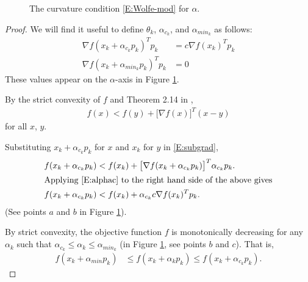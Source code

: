 \begin{figure}[!h]
\centering
\scalebox{.4}{}
\caption{The curvature condition \eqref{E:Wolfe-mod} for $\alpha$.}
\label{F:Wolfe-mod}
\end{figure}

\begin{proof}
We will find it useful to define $\theta_k$, $\alpha_{c_k}$, and $\alpha_{min_k}$ as follows: 
\begin{align}
	\nabla f( x_k + \alpha_{c_k} p_k)^T p_k &= c \nabla f(x_k)^T p_k \label{E:alphac} \\
	\nabla f( x_k + \alpha_{min_k} p_k)^T p_k &= 0 \label{E:alphamin} 
\end{align}
These values appear on the $\alpha$-axis in Figure \ref{F:Wolfe-mod}.

By the strict convexity of $f$ and Theorem 2.14 in \citet[p47]{Rockafellar}, 
\begin{align}
   f(x) < f(y) + \bigl[ \nabla f(x) \bigr]^T (x - y)
        \label{E:subgrad}
\end{align}
for all $x$, $y$.

Substituting $x_k + \alpha_{c_k} p_k$ for $x$ and $x_k$ for $y$ in \eqref{E:subgrad},
\begin{align}
	f( x_k + \alpha_{c_k} p_k ) &< f(x_k) +  \bigl[ \nabla f(x_k + \alpha_{c_k} p_k) \bigr]^T \alpha_{c_k} p_k. \notag \\
	\intertext{Applying \eqref{E:alphac} to the right hand side of the above gives}
	f( x_k + \alpha_{c_k} p_k ) &< f(x_k) + \alpha_{c_k} c \nabla f(x_k)^T p_k. \label{E:b-less-a}
	\end{align}	
(See points $a$ and $b$ in Figure \ref{F:Wolfe-mod}).

By strict convexity, the objective function $f$ is monotonically decreasing for any $\alpha_k$ such that $\alpha_{c_k} \leq \alpha_k \leq \alpha_{min_k}$ (in Figure \ref{F:Wolfe-mod}, see points $b$ and $c$).  That is,
\begin{align}
	f( x_k + \alpha_{min}p_k) &\leq f( x_k + \alpha_k p_k) \leq f( x_k + \alpha_{c_k} p_k). \label{E:f-sandwich}
\end{align}
	

\end{proof}
